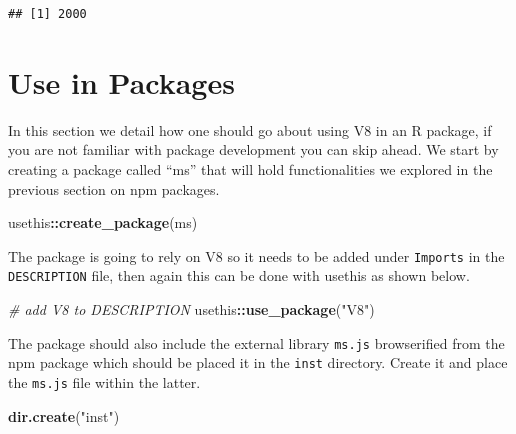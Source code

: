 \documentclass[
]{krantz}
\makeatletter
\newenvironment{Shaded}{\begin{snugshade}}{\end{snugshade}}
\newcommand{\CommentTok}[1]{\textcolor[rgb]{0.37,0.37,0.37}{\textit{#1}}}
\newcommand{\KeywordTok}[1]{\textcolor[rgb]{0.27,0.27,0.27}{\textbf{#1}}}
\newcommand{\NormalTok}[1]{#1}
\newcommand{\OperatorTok}[1]{\textcolor[rgb]{0.43,0.43,0.43}{\textbf{#1}}}
\newcommand{\StringTok}[1]{\textcolor[rgb]{0.5,0.5,0.5}{#1}}
\newenvironment{kframe}{%
\medskip{}
\setlength{\fboxsep}{.8em}
 \def\at@end@of@kframe{}%
 \ifinner\ifhmode%
  \def\at@end@of@kframe{\end{minipage}}%
  \begin{minipage}{\columnwidth}%
 \fi\fi%
 \def\FrameCommand##1{\hskip\@totalleftmargin \hskip-\fboxsep
 \colorbox{shadecolor}{##1}\hskip-\fboxsep
     \hskip-\linewidth \hskip-\@totalleftmargin \hskip\columnwidth}%
 \MakeFramed {\advance\hsize-\width
   \@totalleftmargin\z@ \linewidth\hsize
   \@setminipage}}%
 {\par\unskip\endMakeFramed%
 \at@end@of@kframe}
\renewenvironment{Shaded}{\begin{kframe}}{\end{kframe}}
\makeatother
\begin{document}
\begin{Shaded}
\end{Shaded}

\begin{verbatim}
## [1] 2000
\end{verbatim}

\hypertarget{use-in-packages}{%
\section*{Use in Packages}\label{use-in-packages}}


In this section we detail how one should go about using V8 in an R package, if you are not familiar with package development you can skip ahead. We start by creating a package called ``ms'' that will hold functionalities we explored in the previous section on npm packages.

\begin{Shaded}
\begin{Highlighting}[]
\NormalTok{usethis}\OperatorTok{::}\KeywordTok{create\_package}\NormalTok{(}\StringTok{\textquotesingle{}ms\textquotesingle{}}\NormalTok{)}
\end{Highlighting}
\end{Shaded}

The package is going to rely on V8 so it needs to be added under \texttt{Imports} in the \texttt{DESCRIPTION} file, then again this can be done with usethis as shown below.

\begin{Shaded}
\begin{Highlighting}[]
\CommentTok{\# add V8 to DESCRIPTION}
\NormalTok{usethis}\OperatorTok{::}\KeywordTok{use\_package}\NormalTok{(}\StringTok{"V8"}\NormalTok{)}
\end{Highlighting}
\end{Shaded}

The package should also include the external library \texttt{ms.js} browserified from the npm package which should be placed it in the \texttt{inst} directory. Create it and place the \texttt{ms.js} file within the latter.

\begin{Shaded}
\begin{Highlighting}[]
\KeywordTok{dir.create}\NormalTok{(}\StringTok{"inst"}\NormalTok{)}
\end{Highlighting}
\end{Shaded}
\end{document}
